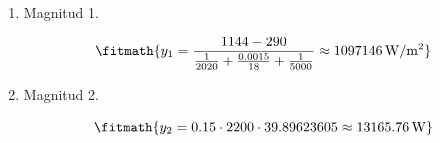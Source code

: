 \begin{enumerate}

\item Magnitud 1.

\[\fitmath{y_{1}=\frac{1144-290}{\frac{1}{2020}+\frac{0.0015}{18}+\frac{1}{5000}}\approx 1097146\,\mathrm{W/m^{2}}}\]

\item Magnitud 2.

\[\fitmath{y_{2}=0.15\cdot 2200\cdot 39.89623605\approx 13165.76\,\mathrm{W}}\]

\end{enumerate}
